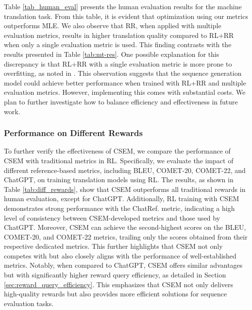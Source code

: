 \documentclass[lettersize,journal]{IEEEtran}
\begin{document}


Table \ref{tab_human_eval} presents the human evaluation results for the machine translation task. From this table, it is evident that optimization using our metrics outperforms MLE. We also observe that RR, when applied with multiple evaluation metrics, results in higher translation quality compared to RL+RR when only a single evaluation metric is used. This finding contrasts with the results presented in Table \ref{tab:mt-res}. One possible explanation for this discrepancy is that RL+RR with a single evaluation metric is more prone to overfitting, as noted in \cite{fernandes2022quality}. This observation suggests that the sequence generation model could achieve better performance when trained with RL+RR and multiple evaluation metrics. However, implementing this comes with substantial costs. We plan to further investigate how to balance efficiency and effectiveness in future work.

\subsubsection{Performance on Different Rewards}
To further verify the effectiveness of CSEM, we compare the performance of CSEM with traditional metrics in RL. Specifically, we evaluate the impact of different reference-based metrics, including BLEU, COMET-20, COMET-22, and ChatGPT, on training translation models using RL. The results, as shown in Table \ref{tab:diff_rewards}, show that CSEM outperforms all traditional rewards in human evaluation, except for ChatGPT. Additionally, RL training with CSEM demonstrates strong performance with the ChatRef. metric, indicating a high level of consistency between CSEM-developed metrics and those used by ChatGPT. Moreover, CSEM can achieve the second-highest scores on the BLEU, COMET-20, and COMET-22 metrics, trailing only the scores obtained from their respective dedicated metrics. This further highlights that CSEM not only competes with but also closely aligns with the performance of well-established metrics. Notably, when compared to ChatGPT, CSEM offers similar advantages but with significantly higher reward query efficiency, as detailed in Section \ref{sec:reward_query_efficiency}. This emphasizes that CSEM not only delivers high-quality rewards but also provides more efficient solutions for sequence evaluation tasks.
\end{document}
